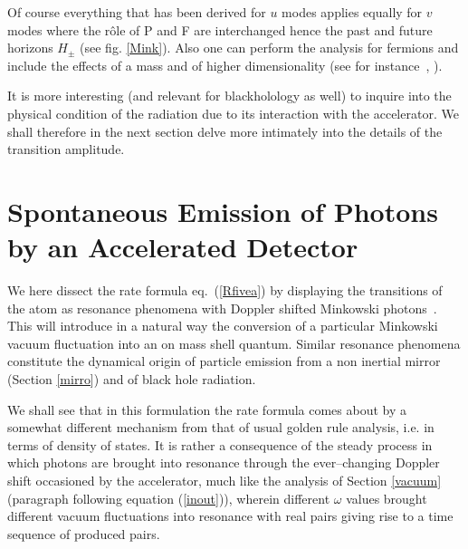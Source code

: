 \documentclass[12pt,oneside]{report}
\begin{document}
Of course everything that has been derived for $u$ modes applies equally for $v$
modes where the r\^ole of P and F are interchanged hence the past and
future horizons $H_\pm$ (see fig. \ref{Mink}). Also one can  perform the
analysis for fermions and include the effects of  a
mass and of higher dimensionality (see for instance~\cite{Spin}, \cite{SCD}).

It is more interesting (and relevant for blackholology as well) to inquire into
the physical condition of the radiation due to its interaction with the
accelerator.
 We shall therefore in the next section delve more
intimately into the details of the transition amplitude. 


\section{Spontaneous Emission of Photons by an Accelerated
Detector}\label{spontaneous} 

We here dissect the rate formula eq.~(\ref{Rfivea}) by
displaying the transitions of the atom as resonance phenomena with Doppler
shifted Minkowski photons~\cite{PaBr}. This will introduce in a natural way the
conversion of a particular Minkowski vacuum fluctuation into an on mass shell
quantum. Similar resonance phenomena constitute the dynamical origin of
particle emission from a non inertial mirror (Section \ref{mirro}) and of black
hole radiation. 

We shall see that in this formulation the rate formula comes
about by a somewhat different mechanism from that of usual golden rule analysis,
i.e. in terms of density of states. It is rather a consequence of the steady
process in which photons are brought into resonance through the ever--changing
Doppler shift occasioned by the accelerator, much like the analysis  of Section
\ref{vacuum} (paragraph following equation (\ref{inout})), wherein different
$\omega$ values brought different vacuum fluctuations into resonance with real
pairs giving rise to a time sequence of produced pairs.
\end{document}

